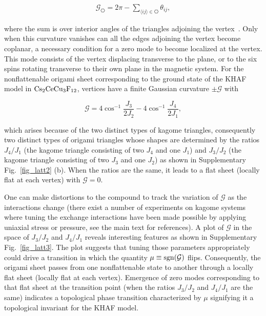 \documentclass[a4paper,aps,prl,floatfix,showpacs,superscriptaddress,notitlepage]{revtex4-1}
\begin{document}
\begin{align}
\label{eq:gauss}
\mathcal{G}_{\hexagon} = 2\pi - \sum_{\langle ij \rangle \in \hexagon} \theta_{ij},
\end{align}

\noindent where the sum is over interior angles of the triangles adjoining the vertex~\cite{calladine1988theory}. Only when this curvature vanishes can all the edges adjoining the vertex become coplanar, a necessary condition for a zero mode to become localized at the vertex. This mode consists of the vertex displacing transverse to the plane, or to the six spins rotating transverse to their own plane in the magnetic system. For the nonflattenable origami sheet corresponding to the ground state of the KHAF model in ${\rm Cs}_2{\rm CeCu}_3{\rm F}_{12}$, vertices have a finite Gaussian curvature $\pm \mathcal{G}$ with

\begin{equation}
 \mathcal{G} = 4\cos^{-1}\frac{J_3}{2J_2} - 4\cos^{-1}\frac{J_4}{2J_1},
 \label{eq:nonflat}
\end{equation}

\noindent which arises because of the two distinct types of kagome triangles, consequently two distinct types of origami triangles whose shapes are determined by the ratios $J_4/J_1$ (the kagome triangle consisting of two $J_4$ and one $J_1$) and $J_3/J_2$ (the kagome triangle consisting of two $J_3$ and one $J_2$) as shown in Supplementary Fig.~\ref{fig_latt2} (b). When the ratios are the same, it leads to a flat sheet (locally flat at each vertex) with $\mathcal{G}=0$. 

One can make distortions to the compound to track the variation of $\mathcal{G}$ as the interactions change (there exist a number of experiments on kagome systems where tuning the exchange interactions have been made possible by applying uniaxial stress or pressure, see the main text for references). A plot of $\mathcal{G}$ in the space of $J_3/J_2$ and $J_4/J_1$ reveals interesting features as shown in Supplementary Fig.~\ref{fig_latt3}. The plot suggests that tuning those parameters appropriately could drive a transition in which the quantity $\mu\equiv{\rm sgn}(\mathcal{G})$ flips. Consequently, the origami sheet passes from one nonflattenable state to another through a locally flat sheet (locally flat at each vertex). Emergence of zero modes corresponding to that flat sheet at the transition point (when the ratios $J_3/J_2$ and $J_4/J_1$ are the same) indicates a topological phase transition characterized by $\mu$ signifying it a topological invariant for the KHAF model. 
\end{document}
